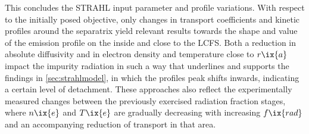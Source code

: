                 This concludes the STRAHL input parameter and profile variations. With respect to the initially posed objective, only changes in transport coefficients and kinetic profiles around the separatrix yield relevant results towards the shape and value of the emission profile on the inside and close to the LCFS. Both a reduction in absolute diffusivity and in electron density and temperature close to $r\ix{a}$ impact the impurity radiation in such a way that underlines and supports the findings in \cref{sec:strahlmodel}, in which the profiles peak shifts inwards, indicating a certain level of detachment. These approaches also reflect the experimentally measured changes between the previously exercised radiation fraction stages, where $n\ix{e}$ and $T\ix{e}$ are gradually decreasing with increasing $f\ix{rad}$ and an accompanying reduction of transport in that area.%
%
